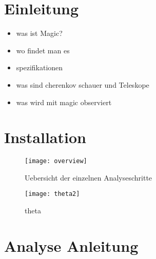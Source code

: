 \documentclass{scrartcl}
\begin{document}
\section{Einleitung}%
\label{sec:einleitung}
\begin{itemize}
	\item was ist Magic?
	\item wo findet man es 
	\item spezifikationen
	\item was sind cherenkov schauer und Teleskope
	\item was wird mit magic observiert
\end{itemize}

\clearpage

\section{Installation}%
\label{sec:installation}

\clearpage

\begin{wrapfigure}{R}{0.34\textwidth}
	\centering
	\texttt{[image: overview]}
	\caption{Uebersicht der einzelnen Analyseschritte}
	\label{fig:analysis}
\end{wrapfigure}

\begin{figure}[htpb]
	\centering
	\texttt{[image: theta2]}
	\caption{theta}
	\label{fig:theta}
\end{figure}

\section{Analyse Anleitung}%
\label{sec:analyse_anleitung}



\blindtext
\blindtext
\blindtext
\blindtext
\end{document}
